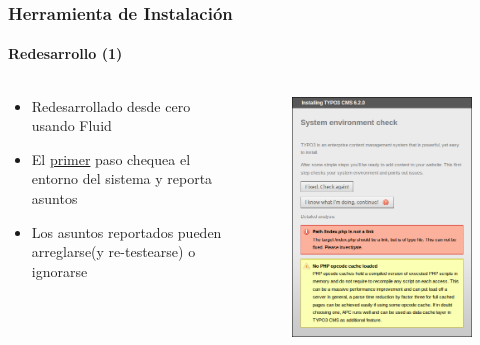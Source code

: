 \begin{frame}[fragile]
	\frametitle{Herramienta de Instalación}
	\framesubtitle{Redesarrollo (1)}

	\begin{columns}[T]

		\begin{column}{.5\textwidth}
			\begin{itemize}
				\item Redesarrollado desde cero usando Fluid
				\item El \underline{primer} paso chequea el entorno del sistema y reporta asuntos
				\item Los asuntos reportados pueden arreglarse\newline (y re-testearse) o ignorarse
			\end{itemize}
		\end{column}

		\begin{column}{.5\textwidth}
			\begin{figure}\vspace*{-0.4cm}
				\includegraphics[width=0.8\linewidth]{Images/InstallTool/SystemEnvironmentCheck.png}
			\end{figure}
		\end{column}

	\end{columns}

\end{frame}


